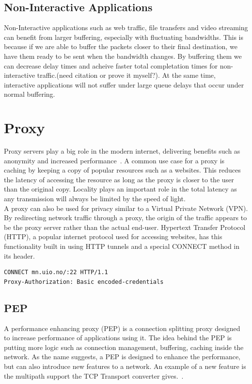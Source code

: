 \documentclass[a4paper,english, 11pt]{report}
\begin{document}
\subsection{Non-Interactive Applications}
Non-Interactive applications such as web traffic, file transfers and video streaming can benefit from larger buffering, especially with fluctuating bandwidths. This is because if we are able to buffer the packets closer to their final destination, we have them ready to be sent when the bandwidth changes. By buffering them we can decrease delay times and acheive faster total completation times for non-interactive traffic.(need citation or prove it myself?). At the same time, interactive applications will not suffer under large queue delays that occur under normal buffering.

\section{Proxy}
Proxy servers play a big role in the modern internet, delivering benefits such as anonymity and increased performance~\cite{nextgen_proxy_servers}. A common use case for a proxy is caching by keeping a copy of popular resources such as a websites. This reduces the latency of accessing the resource as long as the proxy is closer to the user than the original copy. Locality plays an important role in the total latency as any transmission will always be limited by the speed of light.\\

A proxy can also be used for privacy similar to a Virtual Private Network (VPN). By redirecting network traffic through a proxy, the origin of the traffic appears to be the proxy server rather than the actual end-user. Hypertext Transfer Protocol (HTTP), a popular internet protocol used for accessing websites, has this functionality built in using HTTP tunnels and a special CONNECT method in its header.\\

\begin{verbatim}
CONNECT mn.uio.no/:22 HTTP/1.1
Proxy-Authorization: Basic encoded-credentials
\end{verbatim}

\subsection{PEP}
A performance enhancing proxy (PEP) is a connection splitting proxy designed to increase performance of applications using it. The idea behind the PEP is putting more logic such as connection management, buffering, caching inside the network. As the name suggests, a PEP is designed to enhance the performance, but can also introduce new features to a network. An example of a new feature is the multipath support the TCP Transport converter gives.~\cite{rfc8803}.
\end{document}

